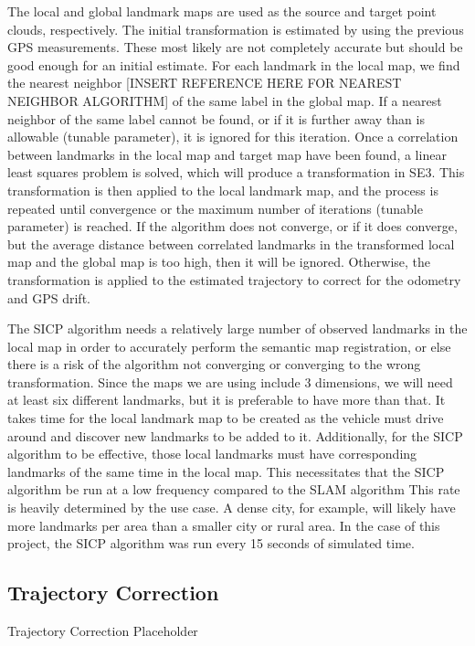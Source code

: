 \documentclass[letterpaper, 10 pt, conference]{ieeeconf}  %
\begin{document}
The local and global landmark maps are used as the source and target point clouds, respectively. The initial transformation is estimated by using the previous GPS measurements. These most likely are not completely accurate but should be good enough for an initial estimate. For each landmark in the local map, we find the nearest neighbor [INSERT REFERENCE HERE FOR NEAREST NEIGHBOR ALGORITHM] of the same label in the global map. If a nearest neighbor of the same label cannot be found, or if it is further away than is allowable (tunable parameter), it is ignored for this iteration. Once a correlation between landmarks in the local map and target map have been found, a linear least squares problem is solved, which will produce a transformation in SE3. This transformation is then applied to the local landmark map, and the process is repeated until convergence or the maximum number of iterations (tunable parameter) is reached. If the algorithm does not converge, or if it does converge, but the average distance between correlated landmarks in the transformed local map and the global map is too high, then it will be ignored. Otherwise, the transformation is applied to the estimated trajectory to correct for the odometry and GPS drift.

The SICP algorithm needs a relatively large number of observed landmarks in the local map in order to accurately perform the semantic map registration, or else there is a risk of the algorithm not converging or converging to the wrong transformation. Since the maps we are using include 3 dimensions, we will need at least six different landmarks, but it is preferable to have more than that. It takes time for the local landmark map to be created as the vehicle must drive around and discover new landmarks to be added to it. Additionally, for the SICP algorithm to be effective, those local landmarks must have corresponding landmarks of the same time in the local map. This necessitates that the SICP algorithm be run at a low frequency compared to the SLAM algorithm This rate is heavily determined by the use case. A dense city, for example, will likely have more landmarks per area than a smaller city or rural area. In the case of this project, the SICP algorithm was run every 15 seconds of simulated time.


\subsection{Trajectory Correction}

Trajectory Correction Placeholder
\end{document}
